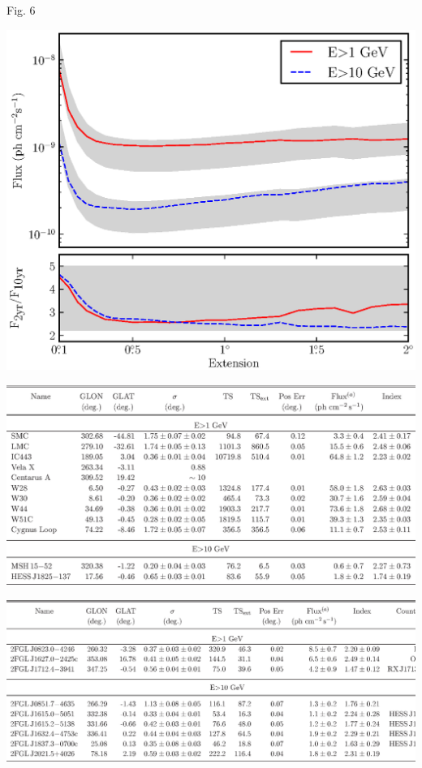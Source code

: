 \documentclass[12pt]{beamer}
\begin{document}
\begin{frame}{Fig. 6}
  \begin{center}
    \includegraphics[scale=0.5]{../paper/mc_plots/time_sensitivity_color.eps}
  \end{center}
\end{frame}


\begin{frame}
  \begin{center}
    \includegraphics[scale=0.5]{tables/table3.eps}
  \end{center}
\end{frame}

\begin{frame}
  \begin{center}
    \includegraphics[scale=0.5]{tables/table4.eps}
  \end{center}
\end{frame}
\end{document}
